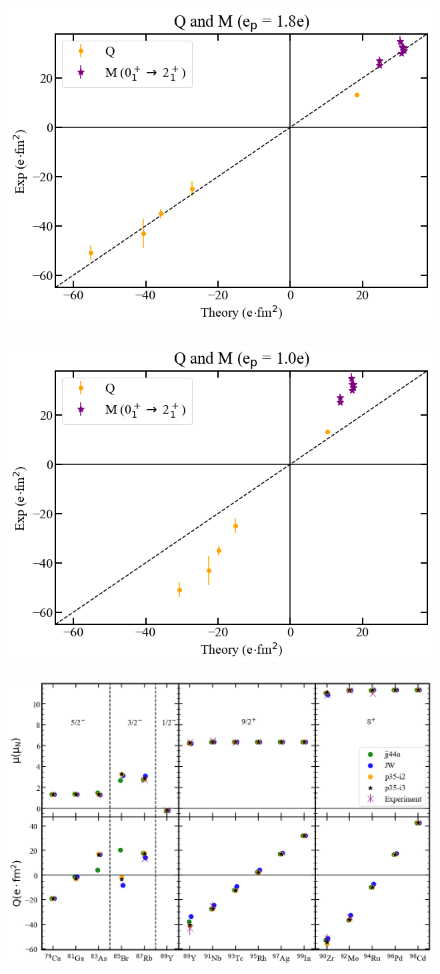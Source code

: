 \documentclass[aps,prl,twocolumn,tightenlines,superscriptaddress,showpacs]{revtex4-1}
\begin{document}
\begin{figure}
\includegraphics[scale=0.35]{qm.png}
\caption{
}
\label{ (10) }
\end{figure}

\begin{figure}
\includegraphics[scale=0.35]{qmfree.png}
\caption{
}
\label{ (11) }
\end{figure}

\begin{figure}
\includegraphics[scale=0.30]{muq.png}
\caption{
}
\label{ (12) }
\end{figure}
\end{document}
